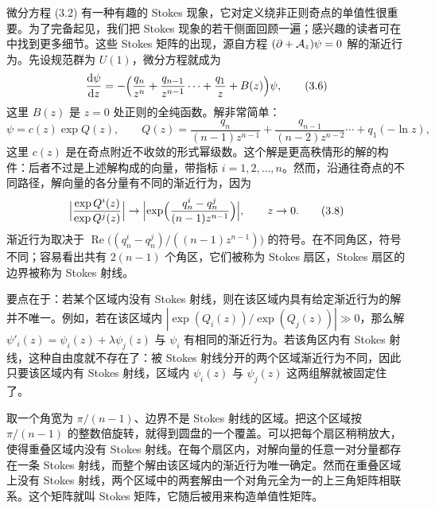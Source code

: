 微分方程 (3.2) 有一种有趣的 Stokes 现象，它对定义绕非正则奇点的单值性很重要。为了完备起见，我们把 Stokes 现象的若干侧面回顾一遍；感兴趣的读者可在 \cite{26,27} 中找到更多细节。这些 Stokes 矩阵的出现，源自方程 $(\partial + \mathcal{A}_z)\psi = 0$ 解的渐近行为。先设规范群为 $U(1)$，微分方程就成为
\begin{equation}
\frac{\mathrm{d}\psi}{\mathrm{d} z} = -\Bigl(\frac{q_n}{z^n} + \frac{q_{n-1}}{z^{n-1}} \cdots + \frac{q_1}{z} + B(z)\Bigr)\psi,
\label{eq:3.6}\tag{3.6}
\end{equation}
这里 $B(z)$ 是 $z=0$ 处正则的全纯函数。解非常简单：
\begin{equation}
\psi = c(z)\exp Q(z),\qquad
Q(z) = \frac{q_n}{(n-1)z^{n-1}} + \frac{q_{n-1}}{(n-2)z^{n-2}} \cdots + q_1(-\ln z),
\label{eq:3.7}\tag{3.7}
\end{equation}
这里 $c(z)$ 是在奇点附近不收敛的形式幂级数。这个解是更高秩情形的解的构件：后者不过是上述解构成的向量，带指标 $i = 1,2,\dots,n$。然而，沿通往奇点的不同路径，解向量的各分量有不同的渐近行为，因为
\begin{equation}
\Bigl|\frac{\exp Q^i(z)}{\exp Q^j(z)}\Bigr| \to
\Bigl|\exp\Bigl(\frac{q_n^i - q_n^j}{(n-1)z^{n-1}}\Bigr)\Bigr|,\qquad z\to 0 .
\label{eq:3.8}\tag{3.8}
\end{equation}
渐近行为取决于 $\operatorname{Re}\bigl((q_n^i-q_n^j)/((n-1)z^{n-1})\bigr)$ 的符号。在不同角区，符号不同；容易看出共有 $2(n-1)$ 个角区，它们被称为 Stokes 扇区，Stokes 扇区的边界被称为 Stokes 射线。

要点在于：若某个区域内没有 Stokes 射线，则在该区域内具有给定渐近行为的解并不唯一。例如，若在该区域内 $|\exp(Q_i(z))/\exp(Q_j(z))|\gg 0$，那么解 $\psi'_i(z) = \psi_i(z) + \lambda\psi_j(z)$ 与 $\psi_i$ 有相同的渐近行为。若该角区内有 Stokes 射线，这种自由度就不存在了：被 Stokes 射线分开的两个区域渐近行为不同，因此只要该区域内有 Stokes 射线，区域内 $\psi_i(z)$ 与 $\psi_j(z)$ 这两组解就被固定住了。

取一个角宽为 $\pi/(n-1)$、边界不是 Stokes 射线的区域。把这个区域按 $\pi/(n-1)$ 的整数倍旋转，就得到圆盘的一个覆盖。可以把每个扇区稍稍放大，使得重叠区域内没有 Stokes 射线。在每个扇区内，对解向量的任意一对分量都存在一条 Stokes 射线，而整个解由该区域内的渐近行为唯一确定。然而在重叠区域上没有 Stokes 射线，两个区域中的两套解由一个对角元全为一的上三角矩阵相联系。这个矩阵就叫 Stokes 矩阵，它随后被用来构造单值性矩阵。

